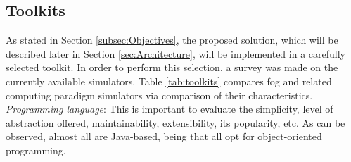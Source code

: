\subsection{Toolkits}
\label{sec:Toolkits}
As stated in Section \ref{subsec:Objectives}, the proposed solution, which will be described later in Section \ref{sec:Architecture}, will be implemented in a carefully selected toolkit. In order to perform this selection, a survey was made on the currently available simulators. Table \ref{tab:toolkits} compares fog and related computing paradigm simulators via comparison of their characteristics.\\[6pt]
\textit{Programming language}: This is important to evaluate the simplicity, level of abstraction offered, maintainability, extensibility, its popularity, etc. As can be observed, almost all are Java-based, being that all opt for object-oriented programming.\\[6pt]
